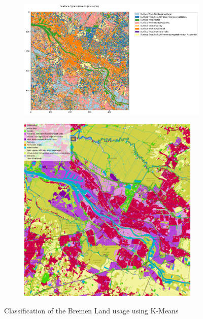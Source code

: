 \documentclass[a4paper, english]{article}
\begin{document}
%
\begin{figure}[!htbp]
    \centering
    \begin{subfigure}{0.58\textwidth}
    \includegraphics[width=\textwidth]{img/Surface Types Bremen (8 cluster).png}
    \end{subfigure}
    \begin{subfigure}{0.40\textwidth}
    \includegraphics[width=0.95\textwidth]{img/OSMLandUseData.png}
    \end{subfigure}
    \caption{Classification of the Bremen Land usage using K-Means \label{fig:classification}}
\end{figure}
\end{document}
